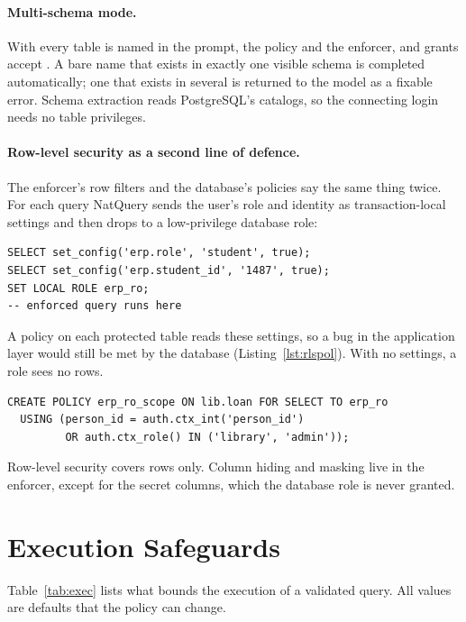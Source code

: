 \paragraph{Multi-schema mode.} With  every table is named
 in the prompt, the policy and the enforcer, and grants accept . A bare
name that exists in exactly one visible schema is completed automatically; one that exists in several
is returned to the model as a fixable error. Schema extraction reads PostgreSQL's catalogs, so the
connecting login needs no table privileges.

\paragraph{Row-level security as a second line of defence.} The enforcer's row filters and the
database's policies say the same thing twice. For each query NatQuery sends the user's role and identity
as transaction-local settings and then drops to a low-privilege database role:

\begin{lstlisting}[caption={What the database receives before the enforced query.}, label={lst:rls}]
SELECT set_config('erp.role', 'student', true);
SELECT set_config('erp.student_id', '1487', true);
SET LOCAL ROLE erp_ro;
-- enforced query runs here
\end{lstlisting}

A policy on each protected table reads these settings, so a bug in the application layer would still be
met by the database (Listing~\ref{lst:rlspol}). With no settings, a role sees no rows.

\begin{lstlisting}[caption={A row-level security policy of the ERP (excerpt).}, label={lst:rlspol}]
CREATE POLICY erp_ro_scope ON lib.loan FOR SELECT TO erp_ro
  USING (person_id = auth.ctx_int('person_id')
         OR auth.ctx_role() IN ('library', 'admin'));
\end{lstlisting}

Row-level security covers rows only. Column hiding and masking live in the enforcer, except for the
secret columns, which the database role is never granted.

\section{Execution Safeguards}

Table~\ref{tab:exec} lists what bounds the execution of a validated query. All values are defaults that
the policy can change.

